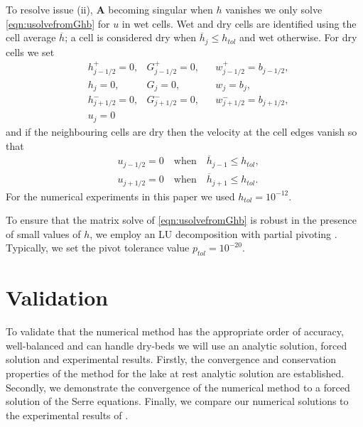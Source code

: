 \documentclass[times]{elsarticle}
\newcommand{\matr}[1]{\mathbf{#1}}
\begin{document}
To resolve issue (ii), $\matr{A}$ becoming singular when $h$ vanishes we only solve \eqref{eqn:usolvefromGhb} for $u$ in wet cells. Wet and dry cells are identified using the cell average $\overline{h}$; a cell is considered dry when $\overline{h}_j \le h_{tol}$ and wet otherwise. For dry cells we set
\begin{align*}
& 	h^+_{j-1/2}  = 0,   & 	G^+_{j-1/2}  = 0, & & 	w^+_{j-1/2}  = b_{j-1/2},   \\
&	h_{j} = 0, & 	G_{j}  = 0,  & 	&w_{j}  = b_{j},\\
& 	h^-_{j+1/2}  = 0,  & 	G^-_{j+1/2}  = 0, & 	&w^-_{j+1/2}  = b_{j+1/2}, \\
& u_j = 0
\end{align*}
and if the neighbouring cells are dry then the velocity at the cell edges vanish so that
\begin{align*}
& 	u_{j-1/2}  = 0  \quad \text{when} \quad\overline{h}_{j-1}\le h_{tol}, \\
& 	u_{j+1/2}  = 0  \quad\text{when}\quad\overline{h}_{j+1} \le h_{tol}.
\end{align*}
For the numerical experiments in this paper we used $h_{tol} = 10^{-12}$.

To ensure that the matrix solve of \eqref{eqn:usolvefromGhb} is robust in the presence of small values of $h$, we employ an LU decomposition with partial pivoting \cite{NumRecC-1996}. Typically, we set the pivot tolerance value $p_{tol}=10^{-20}$. 


\section{Validation}
To validate that the numerical method has the appropriate order of accuracy, well-balanced and can handle dry-beds we will use an analytic solution, forced solution and experimental results. Firstly, the convergence and conservation properties of the method for the lake at rest analytic solution are established. Secondly, we demonstrate the convergence of the numerical method to a forced solution of the Serre equations. Finally, we compare our numerical solutions to the experimental results of \citet{Synolakis-1987-523}.
\end{document}
